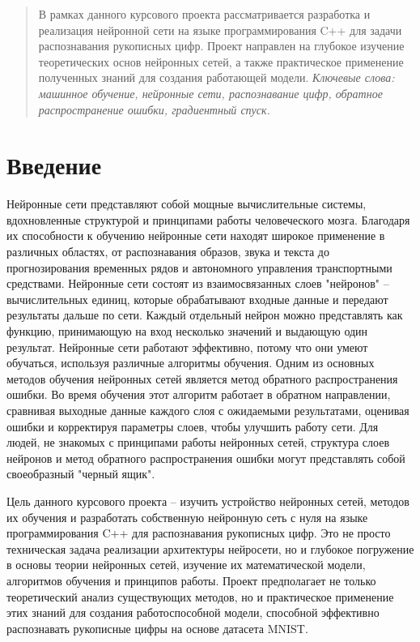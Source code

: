 \documentclass{article}
\begin{document}
\makeTitlePage

\tableofcontents

\newpage
\begin{abstract}
В рамках данного курсового проекта рассматривается разработка и реализация нейронной сети на языке программирования C++ для задачи распознавания рукописных цифр. Проект направлен на глубокое изучение теоретических основ нейронных сетей, а также практическое применение полученных знаний для создания работающей модели. \newline \textit{Ключевые слова: машинное обучение, нейронные сети, распознавание цифр, обратное распространение ошибки, градиентный спуск.}
\end{abstract}


\section{Введение}
Нейронные сети представляют собой мощные вычислительные системы, вдохновленные структурой и принципами работы человеческого мозга. Благодаря их способности к обучению нейронные сети находят широкое применение в различных областях, от распознавания образов, звука и текста до прогнозирования временных рядов и автономного управления транспортными средствами. Нейронные сети состоят из взаимосвязанных слоев "нейронов" –  вычислительных единиц, которые обрабатывают входные данные и передают результаты дальше по сети. Каждый отдельный нейрон можно представлять как функцию, принимающую на вход несколько значений и выдающую один результат. Нейронные сети работают эффективно, потому что они умеют обучаться, используя различные алгоритмы обучения. Одним из основных методов обучения нейронных сетей является метод обратного распространения ошибки. Во время обучения этот алгоритм работает в обратном направлении, сравнивая выходные данные каждого слоя с ожидаемыми результатами, оценивая ошибки и корректируя параметры слоев, чтобы улучшить работу сети. Для людей, не знакомых с принципами работы нейронных сетей, структура слоев нейронов и метод обратного распространения ошибки могут представлять собой своеобразный "черный ящик". 

Цель данного курсового проекта – изучить устройство нейронных сетей, методов их обучения и разработать собственную нейронную сеть с нуля на языке программирования C++ для распознавания рукописных цифр. Это не просто техническая задача реализации архитектуры нейросети, но и глубокое погружение в основы теории нейронных сетей, изучение их математической модели, алгоритмов обучения и принципов работы. Проект предполагает не только теоретический анализ существующих методов, но и практическое применение этих знаний для создания работоспособной модели, способной эффективно распознавать рукописные цифры на основе датасета MNIST.
\end{document}
